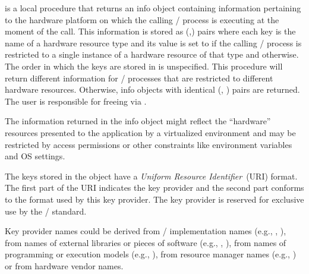  is a local procedure that returns an info object containing
information pertaining to the hardware platform on which the calling \MPI/ process is executing at the
moment of the call. This information is stored as (,)  pairs where each key 
is the name of a hardware resource type and its value is set to  if the calling \MPI/ process
is restricted to a single instance of a hardware resource of that type and  otherwise.
The order in which the keys are stored in   is unspecified.
This procedure will return different information for \MPI/ processes that are restricted to
different hardware resources. Otherwise, info objects with identical (, ) pairs are returned.
The user is responsible for freeing  via .

\begin{users}
  The information returned in the info object might reflect the ``hardware'' resources presented to the application by
  a virtualized environment and may be restricted by access permissions or other constraints like environment
  variables and OS settings.
\end{users}

The keys stored in the  object have a \emph{Uniform Resource Identifier}~(URI) format.
The first part of the URI indicates the key provider and the second part conforms to the format used by
this key provider. The key provider  is reserved for exclusive use by the \MPI/ standard.

\begin{implementors}
  Key provider names could be derived from \MPI/ implementation names (e.g., , ),
  from names of external libraries or pieces of software (e.g., , ), from names
  of programming or execution models (e.g., ), from resource manager names (e.g., )
  or from hardware vendor names.
\end{implementors}

